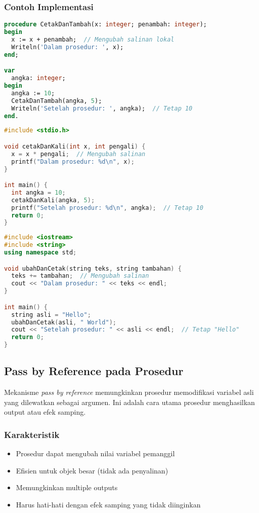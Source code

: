 \documentclass[../main.tex]{subfiles}
\begin{document}
\subsubsection{Contoh Implementasi}
\begin{lstlisting}[language=Pascal, caption={Pass by value pada prosedur (Pascal)}]
procedure CetakDanTambah(x: integer; penambah: integer);
begin
  x := x + penambah;  // Mengubah salinan lokal
  Writeln('Dalam prosedur: ', x);
end;

var
  angka: integer;
begin
  angka := 10;
  CetakDanTambah(angka, 5);
  Writeln('Setelah prosedur: ', angka);  // Tetap 10
end.
\end{lstlisting}

\begin{lstlisting}[language=C, caption={Pass by value pada prosedur (C)}]
#include <stdio.h>

void cetakDanKali(int x, int pengali) {
  x = x * pengali;  // Mengubah salinan
  printf("Dalam prosedur: %d\n", x);
}

int main() {
  int angka = 10;
  cetakDanKali(angka, 5);
  printf("Setelah prosedur: %d\n", angka);  // Tetap 10
  return 0;
}
\end{lstlisting}

\begin{lstlisting}[language=C++, caption={Pass by value pada prosedur (C++)}]
#include <iostream>
#include <string>
using namespace std;

void ubahDanCetak(string teks, string tambahan) {
  teks += tambahan;  // Mengubah salinan
  cout << "Dalam prosedur: " << teks << endl;
}

int main() {
  string asli = "Hello";
  ubahDanCetak(asli, " World");
  cout << "Setelah prosedur: " << asli << endl;  // Tetap "Hello"
  return 0;
}
\end{lstlisting}

\subsection{Pass by Reference pada Prosedur}
Mekanisme \emph{pass by reference} memungkinkan prosedur memodifikasi variabel asli yang dilewatkan sebagai argumen. Ini adalah cara utama prosedur menghasilkan output atau efek samping.

\subsubsection{Karakteristik}
\begin{itemize}
  \item Prosedur dapat mengubah nilai variabel pemanggil
  \item Efisien untuk objek besar (tidak ada penyalinan)
  \item Memungkinkan multiple outputs
  \item Harus hati-hati dengan efek samping yang tidak diinginkan
\end{itemize}
\end{document}
